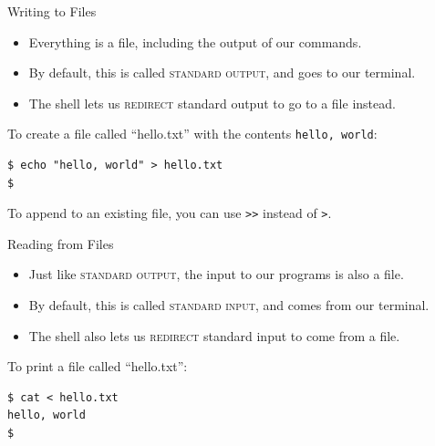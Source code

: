 \begin{frame}[fragile]{Writing to Files}
  \begin{itemize}
    \item
      Everything is a file, including the output of our commands.
      \pause
    \item
      By default, this is called \textsc{standard output}, and goes to our
      terminal.
      \pause
    \item
      The shell lets us \textsc{redirect} standard output to go to a file
      instead.
  \end{itemize}
  \pause
  \begin{example}
    To create a file called \enquote{hello.txt} with the contents
    \texttt{hello, world}:
    \begin{verbatim}
$ echo "hello, world" > hello.txt
$
    \end{verbatim}
    To append to an existing file, you can use \texttt{>>} instead of
    \texttt{>}.
  \end{example}
\end{frame}

\begin{frame}[fragile]{Reading from Files}
  \begin{itemize}
    \item
      Just like \textsc{standard output}, the input to our programs is also a
      file.
      \pause
    \item
      By default, this is called \textsc{standard input}, and comes from our
      terminal.
      \pause
    \item
      The shell also lets us \textsc{redirect} standard input to come from a
      file.
  \end{itemize}
  \pause
  \begin{example}
    To print a file called \enquote{hello.txt}:
    \begin{verbatim}
$ cat < hello.txt
hello, world
$
    \end{verbatim}
  \end{example}
\end{frame}

